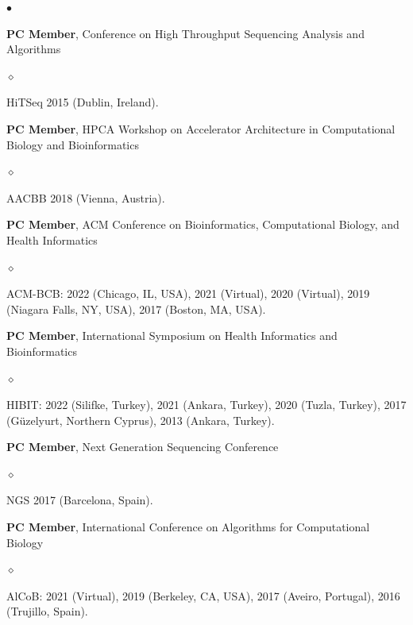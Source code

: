 \documentclass[margin,line]{res}
\newenvironment{list2}{
  \begin{list}{$\bullet$}{%
      \setlength{\itemsep}{0.1cm}
      \setlength{\parsep}{0in} \setlength{\parskip}{0in}
      \setlength{\topsep}{0in} \setlength{\partopsep}{0in} 
      \setlength{\leftmargin}{0.2in}}}{\end{list}}
\newenvironment{list3}{
  \begin{list}{$\diamond$}{%
      \setlength{\itemsep}{0in}
      \setlength{\parsep}{0.1cm} \setlength{\parskip}{0.1cm}
      \setlength{\topsep}{0.1cm} \setlength{\partopsep}{0.1cm} 
      \setlength{\leftmargin}{0.2in}}}{\end{list}}
\begin{document}
\begin{resume}
\begin{list2}
    \item
        \textbf{PC Member}, Conference on High Throughput Sequencing Analysis and Algorithms 
        \begin{list3}
            \item HiTSeq 2015 (Dublin, Ireland).
        \end{list3}
    
    \item
        \textbf{PC Member}, 
        HPCA Workshop on Accelerator Architecture in Computational Biology and Bioinformatics 
        \begin{list3}
            \item AACBB 2018 (Vienna, Austria).
        \end{list3}
    
    \item
        \textbf{PC Member},  ACM Conference on Bioinformatics, Computational Biology, and Health Informatics
        \begin{list3}
            \item ACM-BCB: 2022 (Chicago, IL, USA), 2021 (Virtual),  2020 (Virtual), 2019 (Niagara Falls, NY, USA), 2017 (Boston, MA, USA).
        \end{list3}

    \item
        \textbf{PC Member},  International Symposium on Health Informatics and Bioinformatics
        \begin{list3}
            \item HIBIT: 2022 (Silifke, Turkey),  2021 (Ankara, Turkey),  2020 (Tuzla, Turkey),  2017 (Güzelyurt, Northern Cyprus),  2013 (Ankara, Turkey).
        \end{list3}
    
    \item
        \textbf{PC Member},  Next Generation Sequencing Conference
        \begin{list3}
            \item NGS 2017 (Barcelona, Spain).
        \end{list3}
    

    \item
        \textbf{PC Member}, International Conference on Algorithms for Computational Biology 
        \begin{list3}
            \item AlCoB: 2021 (Virtual),  2019 (Berkeley, CA, USA),  2017 (Aveiro, Portugal), 2016 (Trujillo, Spain).
        \end{list3}
      


\end{list2}
\end{resume}
\end{document}
